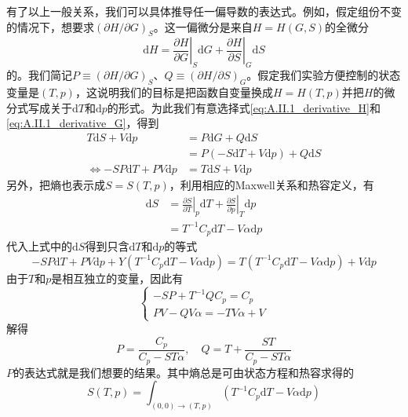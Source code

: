 \documentclass[main.tex]{subfiles}
\begin{document}
有了以上一般关系，我们可以具体推导任一偏导数的表达式。例如，假定组份不变的情况下，想要求$\left(\partial H/\partial G\right)_{S}$。这一偏微分是来自$H=H\left(G,S\right)$的全微分
\[\mathrm{d}H=\left.\frac{\partial H}{\partial G}\right|_{S}\mathrm{d}G+\left.\frac{\partial H}{\partial S}\right|_{G}\mathrm{d}S\]
的。我们简记$P\equiv\left(\partial H/\partial G\right)_{S}$、$Q\equiv\left(\partial H/\partial S\right)_{G}$。假定我们实验方便控制的状态变量是$\left(T,p\right)$，这说明我们的目标是把函数自变量换成$H=H\left(T,p\right)$并把$H$的微分式写成关于$\mathrm{d}T$和$\mathrm{d}p$的形式。为此我们有意选择式\eqref{eq:A.II.1_derivative_H}和\eqref{eq:A.II.1_derivative_G}，得到
\begin{equation*}
    \begin{aligned}
        T\mathrm{d}S+V\mathrm{d}p                     & =P\mathrm{d}G+Q\mathrm{d}S                             \\
                                                      & =P\left(-S\mathrm{d}T+V\mathrm{d}p\right)+Q\mathrm{d}S \\
        \Leftrightarrow  -SP\mathrm{d}T+PV\mathrm{d}p & =T\mathrm{d}S+V\mathrm{d}p
    \end{aligned}
\end{equation*}
另外，把熵也表示成$S=S\left(T,p\right)$，利用相应的Maxwell关系和热容定义，有
\begin{equation*}
    \begin{aligned}
        \mathrm{d}S & =\left.\frac{\partial S}{\partial T}\right|_{p}\mathrm{d}T+\left.\frac{\partial S}{\partial p}\right|_{T}\mathrm{d}p \\
                    & =T^{-1}C_p\mathrm{d}T-V\alpha\mathrm{d}p
    \end{aligned}
\end{equation*}
代入上式中的$\mathrm{d}S$得到只含$\mathrm{d}T$和$\mathrm{d}p$的等式
\[-SP\mathrm{d}T+PV\mathrm{d}p+Y\left(T^{-1}C_p\mathrm{d}T-V\alpha\mathrm{d}p\right)=T\left(T^{-1}C_p\mathrm{d}T-V\alpha\mathrm{d}p\right)+V\mathrm{d}p\]
由于$T$和$p$是相互独立的变量，因此有
\begin{equation*}
    \left\{\begin{array}{l}
        -SP+T^{-1}QC_p=C_p \\
        PV-QV\alpha=-TV\alpha+V
    \end{array}\right.
\end{equation*}
解得
\[P=\frac{C_p}{C_p-ST\alpha},\quad Q=T+\frac{ST}{C_p-ST\alpha}\]
$P$的表达式就是我们想要的结果。其中熵总是可由状态方程和热容求得的
\[S\left(T,p\right)=\int_{\left(0,0\right)\rightarrow\left(T,p\right)}\left(T^{-1}C_p\mathrm{d}T-V\alpha\mathrm{d}p\right)\]
\end{document}
